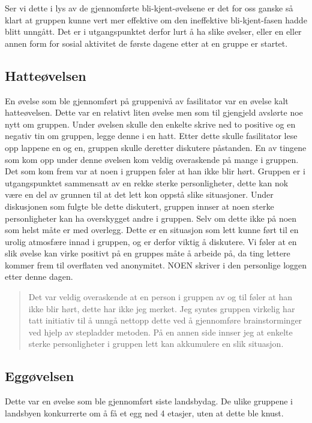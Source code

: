 Ser vi dette i lys av de gjennomførte bli-kjent-øvelsene er det for oss ganske så klart at gruppen kunne vert mer effektive om den ineffektive bli-kjent-fasen hadde blitt unngått. 
Det er i utgangspunktet derfor lurt å ha slike øvelser, eller en eller annen form for sosial aktivitet de første dagene etter at en gruppe er startet. 

\subsection{Hatteøvelsen}
En øvelse som ble gjennomført på gruppenivå av fasilitator var en øvelse kalt hatteøvelsen. 
Dette var en relativt liten øvelse men som til gjengjeld avslørte noe nytt om gruppen. 
Under øvelsen skulle den enkelte skrive ned to positive og en negativ tin om gruppen, legge denne i en hatt. 
Etter dette skulle fasilitator lese opp lappene en og en, gruppen skulle deretter diskutere påstanden. 
En av tingene som kom opp under denne øvelsen kom veldig overaskende på mange i gruppen. 
Det som kom frem var at noen i gruppen føler at han ikke blir hørt. 
Gruppen er i utgangspunktet sammensatt av en rekke sterke personligheter, 
dette kan nok være en del av grunnen til at det lett kon oppstå slike situasjoner. 
Under diskusjonen som fulgte ble dette diskutert, gruppen innser at noen sterke personligheter kan ha overskygget andre i gruppen. 
Selv om dette ikke på noen som helst måte er med overlegg. 
Dette er en situasjon som lett kunne ført til en urolig atmosfære innad i gruppen, og er derfor viktig å diskutere. 
Vi føler at en slik øvelse kan virke positivt på en gruppes måte å arbeide på, da ting lettere kommer frem til overflaten ved anonymitet. 
NOEN skriver i den personlige loggen etter denne dagen.
\begin{quote}
Det var veldig overaskende at en person i gruppen av og til føler at han ikke blir hørt, dette har ikke jeg merket. 
Jeg syntes gruppen virkelig har tatt initiativ til å unngå nettopp dette ved å gjennomføre brainstorminger ved hjelp av stepladder metoden. 
På en annen side innser jeg at enkelte sterke personligheter i gruppen lett kan akkumulere en slik situasjon. 
\end{quote}

\subsection{Eggøvelsen}
Dette var en øvelse som ble gjennomført siste landsbydag.
De ulike gruppene i landsbyen konkurrerte om å få et egg ned 4 etasjer, uten at dette ble knust.

